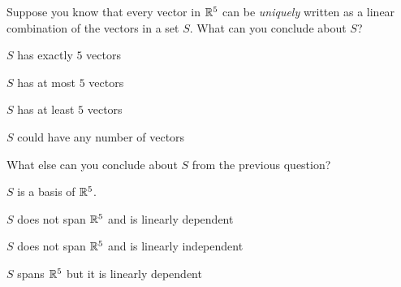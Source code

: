 \begin{readinessAssuranceTest}
\item Suppose you know that every vector in \(\mathbb{R}^5\) can be \textit{uniquely}
      written as a linear combination of 
      the vectors in a set \(S\).  What can you conclude about \(S\)?
\begin{readinessAssuranceTestChoices}
\item \(S\) has exactly \(5\) vectors
\item \(S\) has at most \(5\) vectors
\item \(S\) has at least \(5\) vectors
\item \(S\) could have any number of vectors
\end{readinessAssuranceTestChoices}

\item What else can you conclude about \(S\) from the previous question?
\begin{readinessAssuranceTestChoices}
\item \(S\) is a basis of \(\mathbb{R}^5\).
\item \(S\) does not span \(\mathbb{R}^5\) and is linearly dependent
\item \(S\) does not span \(\mathbb{R}^5\) and is linearly independent
\item \(S\) spans \(\mathbb{R}^5\) but it is linearly dependent
\end{readinessAssuranceTestChoices}

\end{readinessAssuranceTest}
